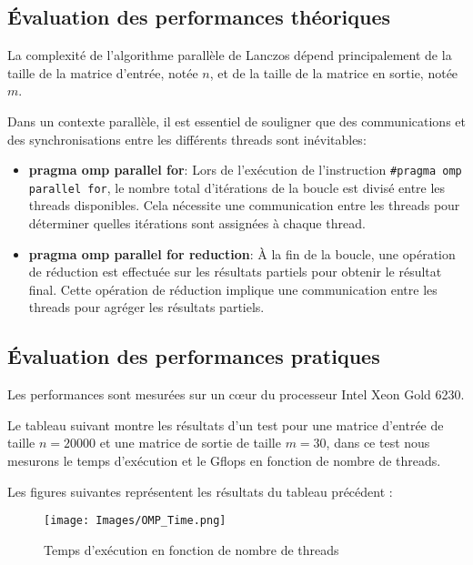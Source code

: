 \documentclass[11pt,french]{article}
\begin{document}
    \newpage
	
	\subsection{Évaluation des performances théoriques}
	La complexité de l'algorithme parallèle de Lanczos dépend principalement de la taille de la matrice d'entrée, notée $n$, et de la taille de la matrice en sortie, notée $m$.

    Dans un contexte parallèle, il est essentiel de souligner que des communications et des synchronisations entre les différents threads sont inévitables: \\
    \begin{itemize}
    \item \textbf{pragma omp parallel for}:  Lors de l'exécution de l'instruction \texttt{\#pragma omp parallel for}, le nombre total d'itérations de la boucle est divisé entre les threads disponibles. Cela nécessite une communication entre les threads pour déterminer quelles itérations sont assignées à chaque thread. \\
    
    \item \textbf{pragma omp parallel for reduction}:  À la fin de la boucle, une opération de réduction est effectuée sur les résultats partiels pour obtenir le résultat final. Cette opération de réduction implique une communication entre les threads pour agréger les résultats partiels.
	\end{itemize}
	\subsection{Évaluation des performances pratiques}
    Les performances sont mesurées sur un cœur du processeur Intel Xeon Gold 6230.

    Le tableau suivant montre les résultats d'un test pour une matrice d'entrée de taille $n=20000$ et une matrice de sortie de taille $m=30$, dans ce test nous mesurons le temps d'exécution et le Gflops en fonction de nombre de threads.
    
    Les figures suivantes représentent les résultats du tableau précédent :
    \begin{figure}[h]
    \centering
    \texttt{[image: Images/OMP\_Time.png]}
    \caption{Temps d'exécution en fonction de nombre de threads}
    \label{fig:mesh1}
    \end{figure}
    \FloatBarrier
    
\end{document}
